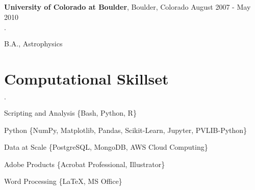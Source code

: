 \documentclass[margin,line]{res}
\newenvironment{list2}{
  \begin{list}{$\cdot$}{%
      \setlength{\itemsep}{0in}
      \setlength{\parsep}{0in} \setlength{\parskip}{0in}
      \setlength{\topsep}{0in} \setlength{\partopsep}{0in} 
      \setlength{\leftmargin}{0.2in}}}{\end{list}}
\newenvironment{list3}{
  \begin{list}{$\cdot$}{%
      \setlength{\itemsep}{0in}
      \setlength{\parsep}{0in} \setlength{\parskip}{0in}
      \setlength{\topsep}{0in} \setlength{\partopsep}{0in} 
      \setlength{\leftmargin}{0.1in}}}{\end{list}}
\begin{document}
\begin{resume}
{\bf University of Colorado at Boulder}, Boulder, Colorado \hfill {August 2007 - May 2010}\\
\vspace*{-.15in}
\begin{list2}
\item B.A., Astrophysics
\end{list2}




\section{\sc Computational Skillset}

\begin{list3}
\item Scripting and Analysis \{Bash, Python, R\}
\item Python \{NumPy, Matplotlib, Pandas, Scikit-Learn, Jupyter, PVLIB-Python\}
\item Data at Scale \{PostgreSQL, MongoDB, AWS Cloud Computing\}
\item Adobe Products \{Acrobat Professional, Illustrator\}
\item Word Processing \{\LaTeX, MS Office\}
\end{list3}



\end{resume}
\end{document}

